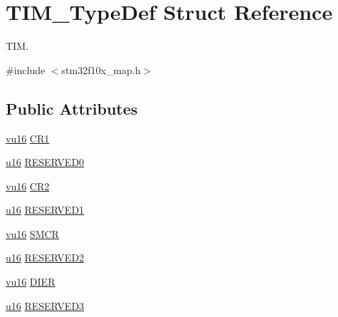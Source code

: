 \hypertarget{struct_t_i_m___type_def}{}\section{T\+I\+M\+\_\+\+Type\+Def Struct Reference}
\label{struct_t_i_m___type_def}


T\+IM.  




{\ttfamily \#include $<$stm32f10x\+\_\+map.\+h$>$}

\subsection*{Public Attributes}
\begin{DoxyCompactItemize}
\item 
\hyperlink{agilefox_2library_2inc_2stm32f10x__type_8h_a9e9f2c67df0bbcd2dd7753693525ee07}{vu16} \hyperlink{struct_t_i_m___type_def_aa6d6b145c88b7fab2f582c4ac7e25f10}{C\+R1}
\item 
\hyperlink{agilefox_2library_2inc_2stm32f10x__type_8h_a9e6c91d77e24643b888dbd1a1a590054}{u16} \hyperlink{struct_t_i_m___type_def_a401d33706ea5b168bd73f95d6789da48}{R\+E\+S\+E\+R\+V\+E\+D0}
\item 
\hyperlink{agilefox_2library_2inc_2stm32f10x__type_8h_a9e9f2c67df0bbcd2dd7753693525ee07}{vu16} \hyperlink{struct_t_i_m___type_def_aaf66ecf9152e78064971d15cbf8e74b8}{C\+R2}
\item 
\hyperlink{agilefox_2library_2inc_2stm32f10x__type_8h_a9e6c91d77e24643b888dbd1a1a590054}{u16} \hyperlink{struct_t_i_m___type_def_a1025485661ba50bb10d0f004521a6a3d}{R\+E\+S\+E\+R\+V\+E\+D1}
\item 
\hyperlink{agilefox_2library_2inc_2stm32f10x__type_8h_a9e9f2c67df0bbcd2dd7753693525ee07}{vu16} \hyperlink{struct_t_i_m___type_def_a276915da29a7637178afc7aed189f2eb}{S\+M\+CR}
\item 
\hyperlink{agilefox_2library_2inc_2stm32f10x__type_8h_a9e6c91d77e24643b888dbd1a1a590054}{u16} \hyperlink{struct_t_i_m___type_def_a5c1397353aeb7502fac6a7c652120323}{R\+E\+S\+E\+R\+V\+E\+D2}
\item 
\hyperlink{agilefox_2library_2inc_2stm32f10x__type_8h_a9e9f2c67df0bbcd2dd7753693525ee07}{vu16} \hyperlink{struct_t_i_m___type_def_ad76da44dc338134b244f4fffb71e1608}{D\+I\+ER}
\item 
\hyperlink{agilefox_2library_2inc_2stm32f10x__type_8h_a9e6c91d77e24643b888dbd1a1a590054}{u16} \hyperlink{struct_t_i_m___type_def_a647ead29eae3a4ef6d523f52a24c1e51}{R\+E\+S\+E\+R\+V\+E\+D3}

\end{DoxyCompactItemize}
